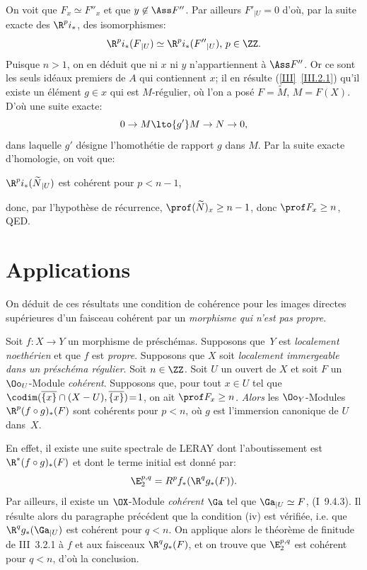 \noindent On voit que $F_x\simeq F''_x$ et que $y\not\in \Ass F''$. Par ailleurs $F'{}_{|U}=0$ d'o\`u, par la suite exacte des $\R^pi_\ast$, des isomorphismes:
\[
\R^pi_\ast(F{}_{|U})\simeq \R^pi_\ast(F''{}_{|U})\text{, }p\in\ZZ.
\]
Puisque $n>1$, on en d\'eduit que ni $x$ ni $y$ n'appartiennent \`a $\Ass F''$. Or ce sont les seuls id\'eaux premiers de $A$ qui contiennent $x$; il en r\'esulte (\ref{III}~\ref{III.2.1}) qu'il existe un \'el\'ement $g\in x$ qui est $M$-r\'egulier, o\`u l'on a pos\'e $F=\widetilde{M}$, $M=F(X)$. D'o\`u une suite exacte:
\[0\to M\lto{g'} M\to N \to 0,
\]
dans laquelle $g'$ d\'esigne l'homoth\'etie de rapport $g$ dans $M$. Par la suite exacte d'homologie, on voit que:

$\R^pi_\ast(\widetilde{N}{}_{|U})$ est coh\'erent pour $p<n-1$,

\noindent donc, par l'hypoth\`ese de r\'ecurrence, $\prof(\widetilde{N})_x\geq n-1$, donc $\prof F_x\geq n$, QED.

\section{Applications} \label{VIII.3}

On d\'eduit de ces r\'esultats une condition de coh\'erence pour les images directes sup\'erieures d'un faisceau coh\'erent par un \emph{morphisme qui n'est pas propre}.

\begin{theoreme} \label{VIII.3.1}
Soit $f\colon X\to Y$ un morphisme de pr\'esch\'emas. Supposons que~$Y$ est \emph{localement noethérien} et que $f$ est \emph{propre}. Supposons que $X$ soit \emph{localement immergeable dans un préschéma régulier}. Soit $n\in\ZZ$. Soit $U$ un ouvert de $X$ et soit $F$ un $\Oo_U$-Module \emph{cohérent}. Supposons que, pour tout $x\in U$ tel que \hbox{$\codim(\overline{\{x\}}\cap (X-U), \overline{\{x\}})\!=\!1$}, on ait $\prof F_x\geq n$. \emph{Alors} les $\Oo_Y$-Modules \hbox{$\R^p(f\circ g)_\ast(F)$} sont coh\'erents pour $p<n$, o\`u $g$ est l'immersion canonique de $U$ dans~$X$.
\end{theoreme}

En effet, il existe une suite spectrale de LERAY dont l'aboutissement est $\R^\ast(f\circ g)_\ast(F)$ et dont le terme initial est donn\'e par:
\[
\E^{p, q}_2=R^pf_\ast(\R^qg_\ast(F)).
\]
Par ailleurs, il existe un $\OX$-Module \emph{cohérent} ${\Ga}$ tel que ${\Ga}{}_{|U}\simeq F$, (\EGA I~9.4.3). Il r\'esulte alors du paragraphe pr\'ec\'edent que la condition (iv) \ignorespaces est v\'erifi\'ee, i.e. que $\R^qg_\ast({\Ga}{}_{|U})$ est coh\'erent pour $q<n$. On applique alors le th\'eor\`eme de finitude de \EGA III~3.2.1 \`a $f$ et aux faisceaux $\R^qg_\ast(F)$, et on trouve que $\E^{p, q}_2$ est coh\'erent pour $q<n$, d'o\`u la conclusion.

